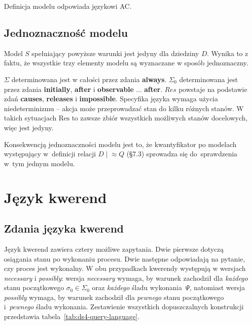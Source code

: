 \documentclass[11pt,a4paper]{article}
\newif\ifshowbib
\newcommand{\bibonly}[1]{\ifshowbib#1\fi}
\renewcommand{\cite}[2][]{\unskip}%
\theoremstyle{definition}
\begin{document}
Definicja modelu odpowiada językowi AC\bibonly{~\cite{rw05}}.

\subsection{Jednoznaczność modelu}
\label{sec:jednoznacznosc-modelu}

Model $S$ spełniający powyższe warunki jest jedyny dla dziedziny $D$. Wynika to z faktu, że wszystkie trzy elementy modelu są wyznaczane w sposób jednoznaczny.

$\Sigma$ determinowana jest w całości przez zdania \textbf{always}. $\Sigma_0$ determinowana jest przez zdania \textbf{initially}, \textbf{after} i \textbf{observable} ... \textbf{after}. $Res$ powstaje na podstawie zdań \textbf{causes}, \textbf{releases} i \textbf{impossible}. Specyfika języka wymaga użycia niedeterminizmu -- akcja może przeprowadzać stan do kilku różnych stanów. W takich sytuacjach $\mathrm{Res}$ to zawsze zbiór wszystkich możliwych stanów docelowych, więc jest jedyny.

Konsekwencją jednoznaczności modelu jest to, że kwantyfikator po modelach występujący w~definicji relacji $D \mid\!\approx Q$ (\S7.3) sprowadza się do~sprawdzenia w~tym jednym modelu.

\section{Język kwerend}

\subsection{Zdania języka kwerend}

Język kwerend zawiera cztery możliwe zapytania. Dwie pierwsze dotyczą osiągania stanu po wykonaniu procesu. Dwie następne odpowiadają na pytanie, czy proces jest wykonalny. W obu przypadkach kwerendy występują w wersjach \textit{necessary} i \textit{possibly}: wersja \textit{necessary} wymaga, by warunek zachodził dla \emph{każdego} stanu początkowego $\sigma_0 \in \Sigma_0$ oraz \emph{każdego} śladu wykonania~$\Psi$, natomiast wersja \textit{possibly} wymaga, by warunek zachodził dla \emph{pewnego} stanu początkowego i~\emph{pewnego} śladu wykonania. Zestawienie wszystkich dopuszczalnych konstrukcji przedstawia tabela~\ref{tab:ds4-query-language}.
\end{document}
